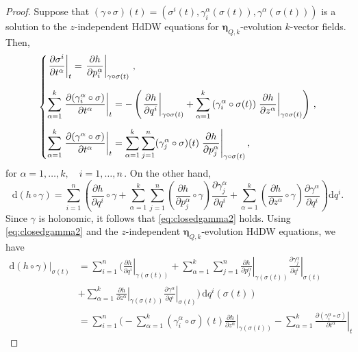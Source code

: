 \documentclass[11pt,twoside]{article}
\theoremstyle{plain}
\theoremstyle{definition}
\theoremstyle{remark}
\newcommand{\dd}{\mathrm{d}}
\newcommand\restr[2]{\left.#1\right|_{#2}} \newcommand{\bfX}{\mathbf{X}} \newcommand{\bfY}{\mathbf{Y}} \newcommand{\bfZ}{\mathbf{Z}} \newcommand{\qeddiamond}{\hfill $\diamond$} \newcommand{\parder}[2]{\frac{\partial #1}{\partial #2}} \newcommand{\dparder}[2]{\dfrac{\partial #1}{\partial #2}} \newcommand{\tparder}[2]{\partial #1/\partial #2} \newcommand{\parderr}[3]{\frac{\partial^2 #1}{\partial #2\partial #3}} \newcommand{\dparderr}[3]{\dfrac{\partial^2 #1}{\partial #2\partial #3}} \newcommand{\tparderr}[3]{\partial^2 #1/\partial #2\partial #3}
\begin{document}
\begin{proof}
Suppose that $(\gamma \circ \sigma)(t) = (\sigma^i(t), \gamma_i^\alpha(\sigma(t)), \gamma^\alpha(\sigma(t)))$ is a solution to the $z$-independent HdDW equations for ${\bm \eta}_{Q,k}$-evolution  $k$-vector fields. Then,
\[
\begin{dcases}
\restr{\dfrac{\partial \sigma^i}{\partial t^\alpha}}{t} = \restr{\dfrac{\partial h}{\partial p_i^\alpha}}{\gamma\circ \sigma(t)}\,,\\[2mm]
\sum_{\alpha=1}^k \restr{\dfrac{\partial(\gamma_i^\alpha\circ \sigma)}{\partial t^\alpha}}{t}
=
-\left( \restr{\dfrac{\partial h}{\partial q^i}}{\gamma\circ \sigma(t)} + \sum_{\alpha=1}^k\left(\gamma_i^\alpha \circ \sigma(t) \right) \restr{\dfrac{\partial h}{\partial z^\alpha}}{\gamma\circ \sigma(t)}\right)\,,  \\[2mm]
\sum_{\alpha=1}^k \restr{\dfrac{\partial(\gamma^\alpha\circ \sigma)}{\partial t^\alpha}}{t}
=
\sum_{\alpha=1}^k\sum_{j=1}^n (\gamma^\alpha_j\circ \sigma)(t) \restr{\dfrac{\partial h}{\partial p_j^\alpha}}{\gamma\circ \sigma(t)},
\end{dcases}
\]
for $\alpha=1,\dotsc,k,\quad i=1,\dotsc,n\,.$ On the other hand,
\[
\dd(h \circ \gamma)
=
\sum_{i=1}^n\left( \frac{\partial h}{\partial q^i} \circ \gamma + \sum_{\alpha=1}^k\sum_{j=1}^n\left( \frac{\partial h}{\partial p_j^\alpha}\circ \gamma \right) \frac{\partial \gamma_j^\alpha}{\partial q^i} + \sum_{\alpha=1}^k\left( \frac{\partial h}{\partial z^\alpha}\circ \gamma \right) \frac{\partial \gamma^\alpha}{\partial q^i} \right) \dd q^i.
\]
Since $\gamma$ is holonomic, it follows that \eqref{eq:closedgamma2} holds.
Using \eqref{eq:closedgamma2} and the $z$-independent $\bm\eta_{Q,k}$-evolution HdDW equations, we have
\begin{align*}
\restr{\dd(h\circ \gamma)}{\sigma(t)}
&=
\sum_{i=1}^n
\Bigg(
  \restr{\frac{\partial h}{\partial q^i}}{\gamma(\sigma(t))}
  + \sum_{\alpha=1}^k \sum_{j=1}^n
    \restr{\frac{\partial h}{\partial p^\alpha_j}}{\gamma(\sigma(t))}
    \restr{\frac{\partial \gamma^\alpha_j}{\partial q^i}}{\sigma(t)}\\[1ex]&
  + \sum_{\alpha=1}^k
    \restr{\frac{\partial h}{\partial z^\alpha}}{\gamma(\sigma(t))}
    \restr{\frac{\partial \gamma^\alpha}{\partial q^i}}{\sigma(t)}
\Bigg)
\, \dd q^i(\sigma(t))
\\[1ex]
&=
\sum_{i=1}^n
\Bigg(
  - \sum_{\alpha=1}^k
    \left(\gamma_i^\alpha\circ \sigma\right)(t)
    \restr{\frac{\partial h}{\partial z^\alpha}}{\gamma(\sigma(t))}
  - \sum_{\alpha=1}^k
    \restr{\frac{\partial(\gamma_i^\alpha\circ\sigma)}{\partial t^\alpha}}{t}

\end{align*}
\end{proof}
\end{document}
